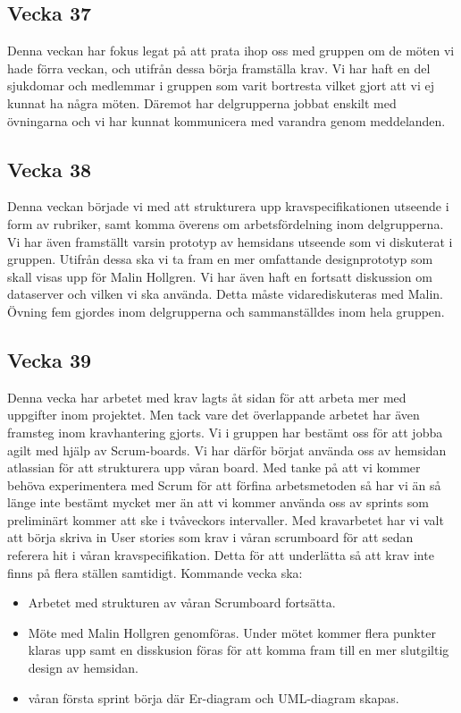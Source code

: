 \documentclass[12pt]{article}
\begin{document}
    \subsection{Vecka 37}
    Denna veckan har fokus legat på att prata ihop oss med gruppen om de möten vi hade förra veckan, och utifrån dessa börja framställa krav. Vi har haft en del sjukdomar och medlemmar i gruppen som varit bortresta vilket gjort att vi ej kunnat ha några möten. Däremot har delgrupperna jobbat enskilt med övningarna och vi har kunnat kommunicera med varandra genom meddelanden.
    
    \subsection{Vecka 38}
    Denna veckan började vi med att strukturera upp kravspecifikationen utseende i form av rubriker, samt komma överens om arbetsfördelning inom delgrupperna. Vi har även framställt varsin prototyp av hemsidans utseende som vi diskuterat i gruppen. Utifrån dessa ska vi ta fram en mer omfattande designprototyp som skall visas upp för Malin Hollgren. Vi har även haft en fortsatt diskussion om dataserver och vilken vi ska använda. Detta måste vidarediskuteras med Malin. Övning fem gjordes inom delgrupperna och sammanställdes inom hela gruppen.
    
    \subsection{Vecka 39}
    Denna vecka har arbetet med krav lagts åt sidan för att arbeta mer med uppgifter inom projektet. Men tack vare det överlappande arbetet har även framsteg inom kravhantering gjorts. Vi i gruppen har bestämt oss för att jobba agilt med hjälp av Scrum-boards. Vi har därför börjat använda oss av hemsidan atlassian för att strukturera upp våran board. Med tanke på att vi kommer behöva experimentera med Scrum för att förfina arbetsmetoden så har vi än så länge inte bestämt mycket mer än att vi kommer använda oss av sprints som preliminärt kommer att ske i tvåveckors intervaller. 
    Med kravarbetet har vi valt att börja skriva in User stories som krav i våran scrumboard för att sedan referera hit i våran kravspecifikation. Detta för att underlätta så att krav inte finns på flera ställen samtidigt.
    Kommande vecka ska: \\ 
    \begin{itemize}
        \item Arbetet med strukturen av våran Scrumboard fortsätta.
        \item Möte med Malin Hollgren genomföras. Under mötet kommer flera 
        punkter klaras upp samt en disskusion föras för att komma fram till en mer slutgiltig design av hemsidan.
        \item våran första sprint börja där Er-diagram och UML-diagram skapas.
    \end{itemize}
    
\end{document}
